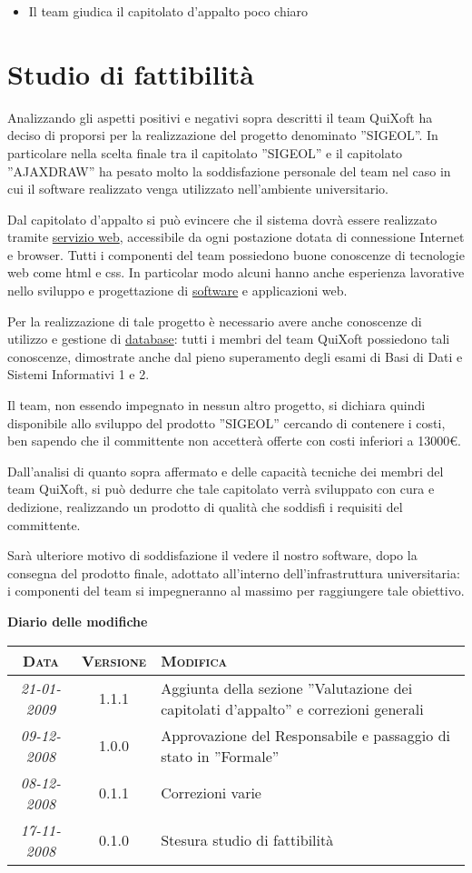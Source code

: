 \documentclass[11pt,a4paper]{article}
\newcommand{\modifiche} 
{
\newpage
\begin{center}
\textbf{Diario delle modifiche} \\
\bigskip
\begin{tabular}{|c|c|p{0.62\textwidth}|}
\hline
\textsc{Data} & \textsc{Versione} & \textsc{Modifica} \\
\hline
\hline
\textit{21-01-2009} & 1.1.1 & Aggiunta della sezione ''Valutazione dei capitolati d'appalto'' e correzioni generali  \\
\hline
\textit{09-12-2008} & 1.0.0 & Approvazione del Responsabile e passaggio di stato in ''Formale''\\
\hline
\textit{08-12-2008} & 0.1.1 & Correzioni varie  \\
\hline
\textit{17-11-2008} & 0.1.0 & Stesura studio di fattibilità \\
\hline
\end{tabular}
\end{center}
}
\begin{document}
\begin{itemize}
 \item Il team giudica il capitolato d'appalto poco chiaro
\end{itemize}

\section{Studio di fattibilità}
Analizzando gli aspetti positivi e negativi sopra descritti il team QuiXoft ha deciso di proporsi per la realizzazione del progetto denominato ''SIGEOL''. In particolare nella scelta finale tra il capitolato ''SIGEOL'' e il capitolato ''AJAXDRAW'' ha pesato molto la soddisfazione personale del team nel caso in cui il software realizzato venga utilizzato nell'ambiente universitario.

Dal capitolato d'appalto si può evincere che il sistema dovrà essere realizzato tramite  \underline{servizio web}, accessibile da ogni postazione dotata di connessione Internet e browser.
Tutti i componenti del team possiedono buone conoscenze di tecnologie web come html e css.
In particolar modo alcuni hanno anche esperienza lavorative nello sviluppo e progettazione di \underline{software} e applicazioni web.

Per la realizzazione di tale progetto è necessario avere anche conoscenze di utilizzo e gestione di \underline{database}: tutti i membri del team QuiXoft possiedono tali conoscenze, dimostrate anche dal pieno superamento degli esami di Basi di Dati e Sistemi Informativi 1 e 2.

Il team, non essendo impegnato in nessun altro progetto, si dichiara quindi disponibile allo sviluppo del prodotto ''SIGEOL'' cercando di contenere i costi, ben sapendo che il committente non accetterà offerte con costi inferiori a 13000\textgreek{\euro}.

Dall'analisi di quanto sopra affermato e delle capacità tecniche dei membri del team QuiXoft, si può dedurre che tale capitolato verrà sviluppato con cura e dedizione, realizzando un prodotto di qualità che soddisfi i requisiti del committente.

Sarà ulteriore motivo di soddisfazione il vedere il nostro software, dopo la consegna del prodotto finale, adottato all'interno dell'infrastruttura universitaria: i componenti  del team si impegneranno al massimo per raggiungere tale obiettivo.
\modifiche
\end{document}
